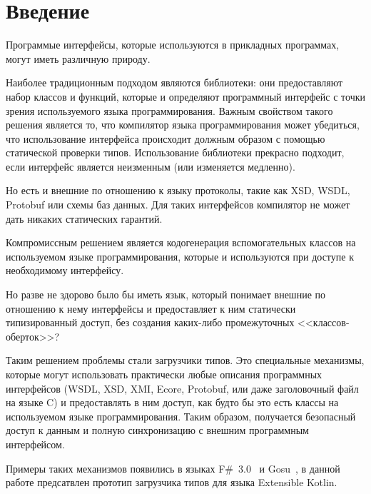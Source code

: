 \section{Введение}

Программые интерфейсы, которые используются в прикладных программах, могут иметь различную природу. 

Наиболее традиционным подходом являются библиотеки: они предоставляют набор классов и функций, которые и определяют программный интерфейс с точки зрения используемого языка программирования.
Важным свойством такого решения является то, что компилятор языка программирования может убедиться, что использование интерфейса происходит должным образом с помощью статической проверки типов. Использование библиотеки прекрасно подходит, если интерфейс является неизменным (или изменяется медленно).

Но есть и внешние по отношению к языку протоколы, такие как XSD, WSDL, Protobuf или схемы баз данных. Для таких интерфейсов компилятор не может дать никаких статических гарантий.

Компромиссным решением является кодогенерация вспомогательных классов на используемом языке программирования, которые и используются при доступе к необходимому интерфейсу.

Но разве не здорово было бы иметь язык, который понимает внешние по отношению к нему интерфейсы и предоставляет к ним статически типизированный доступ, без создания каких-либо промежуточных <<классов-оберток>>?

Таким решением проблемы стали загрузчики типов. Это специальные механизмы, которые могут использовать практически любые описания программных интерфейсов (WSDL, XSD, XMI, Ecore, Protobuf, или даже заголовочный файл на языке C) и предоставлять в ним доступ, как будто бы это есть классы на используемом \td языке программирования. Таким образом, получается безопасный доступ к данным и полную синхронизацию с внешним программным интерфейсом.

Примеры таких механизмов появились в языках F\#~3.0~\cite{joepamer2011} и Gosu~\cite{gosuguide}, в данной работе предсатвлен прототип загрузчика типов для языка Extensible Kotlin.





\clearpage